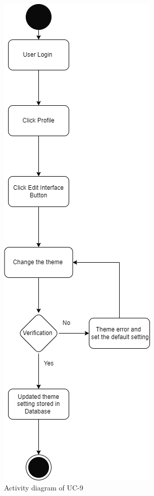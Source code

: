 \begin{figure}[H]
    \centering
    \includegraphics[scale=0.5]{./diagrams/Activity Diagram/ad-09.png}
    \caption{Activity diagram of UC-9}
    \label{fig:act-09}

\end{figure}


